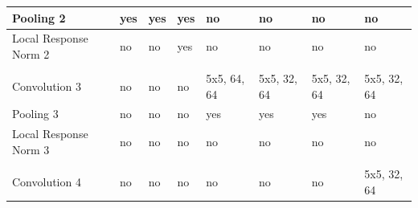 \documentclass{article} %
\begin{document}
\begin{table}[h]
{\begin{tabular}{llllllll}
\multicolumn{1}{|l|}{Pooling 2}             & \multicolumn{1}{l|}{yes}         & \multicolumn{1}{l|}{yes}          & \multicolumn{1}{l|}{yes}         & \multicolumn{1}{l|}{no}          & \multicolumn{1}{l|}{no}          & \multicolumn{1}{l|}{no}          & \multicolumn{1}{l|}{no}          \\ \hline
\multicolumn{1}{|l|}{Local Response Norm 2} & \multicolumn{1}{l|}{no}          & \multicolumn{1}{l|}{no}           & \multicolumn{1}{l|}{yes}         & \multicolumn{1}{l|}{no}          & \multicolumn{1}{l|}{no}          & \multicolumn{1}{l|}{no}          & \multicolumn{1}{l|}{no}          \\ \hline
                                            &                                  &                                   &                                  &                                  &                                  &                                  &                                  \\ \hline
\multicolumn{1}{|l|}{Convolution 3}         & \multicolumn{1}{l|}{no}          & \multicolumn{1}{l|}{no}           & \multicolumn{1}{l|}{no}          & \multicolumn{1}{l|}{5x5, 64, 64} & \multicolumn{1}{l|}{5x5, 32, 64} & \multicolumn{1}{l|}{5x5, 32, 64} & \multicolumn{1}{l|}{5x5, 32, 64} \\ \hline
\multicolumn{1}{|l|}{Pooling 3}             & \multicolumn{1}{l|}{no}          & \multicolumn{1}{l|}{no}           & \multicolumn{1}{l|}{no}          & \multicolumn{1}{l|}{yes}         & \multicolumn{1}{l|}{yes}         & \multicolumn{1}{l|}{yes}         & \multicolumn{1}{l|}{no}          \\ \hline
\multicolumn{1}{|l|}{Local Response Norm 3} & \multicolumn{1}{l|}{no}          & \multicolumn{1}{l|}{no}           & \multicolumn{1}{l|}{no}          & \multicolumn{1}{l|}{no}          & \multicolumn{1}{l|}{no}          & \multicolumn{1}{l|}{no}          & \multicolumn{1}{l|}{no}          \\ \hline
                                            &                                  &                                   &                                  &                                  &                                  &                                  &                                  \\ \hline
\multicolumn{1}{|l|}{Convolution 4}         & \multicolumn{1}{l|}{no}          & \multicolumn{1}{l|}{no}           & \multicolumn{1}{l|}{no}          & \multicolumn{1}{l|}{no}          & \multicolumn{1}{l|}{no}          & \multicolumn{1}{l|}{no}          & \multicolumn{1}{l|}{5x5, 32, 64} \\ \hline

\end{tabular}}
\end{table}
\end{document}
